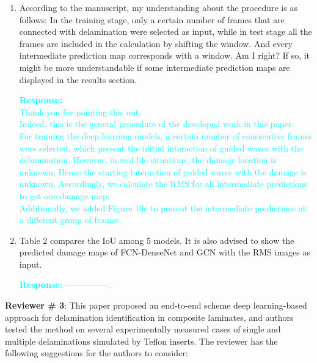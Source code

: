 \documentclass[11pt,a2paper]{report}
\begin{document}
\begin{enumerate}
	\item According to the manuscript, my understanding about the procedure is 
	as follows: In the training stage, only a certain number of frames that are 
	connected with delamination were selected as input, while in test stage all 
	the frames are included in the calculation by shifting the window.
	And every intermediate prediction map corresponds with a window. 
	Am I right? If so, it might be more understandable if some intermediate 
	prediction maps are displayed in the results section.

\textcolor{Cyan}{
	\textbf{Response:} \\
	Thank you for pointing this out. \\
	Indeed, this is the general procedure of the developed work in this paper.\\
	For training the deep learning models, a certain number of consecutive frames were selected, which present the initial interaction of guided waves with the delamination.
	However, in real-life situations, the damage location is unknown.
	Hence the starting interaction of guided waves with the damage is unknown.
	Accordingly, we calculate the RMS for all intermediate predictions to get one damage map. \\
	Additionally, we added Figure 10c to present the intermediate predictions at a different group of frames.
}

	\item Table 2 compares the IoU among 5 models. It is also advised to show 
	the predicted damage maps of FCN-DenseNet and GCN with the RMS images as 
	input.

\textcolor{Cyan}{
	\textbf{Response:}
	---------------.
}

\end{enumerate}	

\newpage 
\textbf{Reviewer \# 3}:
\newline This paper proposed an end-to-end scheme deep learning-based approach 
for delamination identification in composite laminates, and authors tested the 
method on several experimentally measured cases of single and multiple 
delaminations simulated by Teﬂon inserts.
The reviewer has the following suggestions for the authors to consider:
\end{document}

